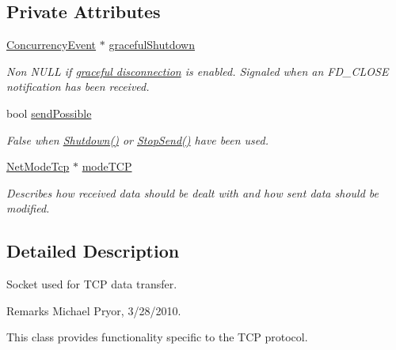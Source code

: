 \subsection*{Private Attributes}
\begin{DoxyCompactItemize}
\item 
\hyperlink{class_concurrency_event}{ConcurrencyEvent} $\ast$ \hyperlink{class_net_socket_t_c_p_a59ecfff878b08596b570c17ae57b93b9}{gracefulShutdown}
\begin{DoxyCompactList}\small\item\em Non NULL if \hyperlink{graceful_disconnect_page}{graceful disconnection} is enabled. Signaled when an {\ttfamily FD\_\-CLOSE} notification has been received. \item\end{DoxyCompactList}\item 
bool \hyperlink{class_net_socket_t_c_p_a405f72b045af06f88730b1b239dfe61d}{sendPossible}
\begin{DoxyCompactList}\small\item\em False when \hyperlink{class_net_socket_t_c_p_a31775717fef7b062f9af098ca5e6b7c9}{Shutdown()} or \hyperlink{class_net_socket_t_c_p_a71e478845fc449fc9fccaa098db37c50}{StopSend()} have been used. \item\end{DoxyCompactList}\item 
\hypertarget{class_net_socket_t_c_p_aafcdf2d4234f269eab1c9d43955e99bc}{
\hyperlink{class_net_mode_tcp}{NetModeTcp} $\ast$ \hyperlink{class_net_socket_t_c_p_aafcdf2d4234f269eab1c9d43955e99bc}{modeTCP}}
\label{class_net_socket_t_c_p_aafcdf2d4234f269eab1c9d43955e99bc}

\begin{DoxyCompactList}\small\item\em Describes how received data should be dealt with and how sent data should be modified. \item\end{DoxyCompactList}\end{DoxyCompactItemize}


\subsection{Detailed Description}
Socket used for TCP data transfer. \begin{DoxyRemark}{Remarks}
Michael Pryor, 3/28/2010.
\end{DoxyRemark}
This class provides functionality specific to the TCP protocol.\par
\par


